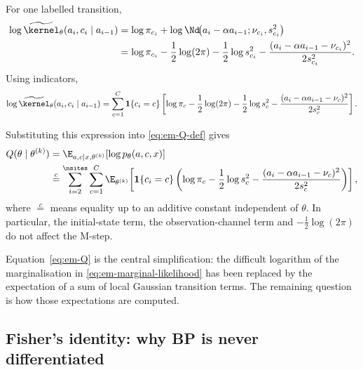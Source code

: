 For one labelled transition,
\begin{align}
  \log
  \widetilde\kernel_\theta(a_i,c_i\mid a_{i-1})
  &=
  \log\pi_{c_i}
  +
  \log
  \Nd\!\big(
    a_i-\alpha a_{i-1};
    \nu_{c_i},s_{c_i}^2
  \big)
  \nonumber\\
  &=
  \log\pi_{c_i}
  -\frac12\log(2\pi)
  -\frac12\log s_{c_i}^2
  -
  \frac{
    (a_i-\alpha a_{i-1}-\nu_{c_i})^2
  }{2s_{c_i}^2}.
  \label{eq:em-single-transition-log}
\end{align}
Using indicators,
\begin{align}
  \log
  \widetilde\kernel_\theta(a_i,c_i\mid a_{i-1})
  =
  \sum_{c=1}^{C}
  \mathbf 1\{c_i=c\}
  \left[
    \log\pi_c
    -\frac12\log(2\pi)
    -\frac12\log s_c^2
    -
    \frac{
      (a_i-\alpha a_{i-1}-\nu_c)^2
    }{2s_c^2}
  \right].
  \label{eq:em-indicator-transition}
\end{align}

Substituting this expression into \eqref{eq:em-Q-def} gives
\begin{align}
  Q(\theta\mid\theta^{(k)})
  &=
  \E_{a,c\mid x,\theta^{(k)}}
  \!\left[
    \log p_\theta(a,c,x)
  \right]
  \nonumber\\
  &\overset{c}{=}
  \sum_{i=2}^{\nsites}
  \sum_{c=1}^{C}
  \E_{\theta^{(k)}}\!
  \left[
    \mathbf 1\{c_i=c\}
    \left(
      \log\pi_c
      -\frac12\log s_c^2
      -
      \frac{
        (a_i-\alpha a_{i-1}-\nu_c)^2
      }{2s_c^2}
    \right)
  \right],
  \label{eq:em-Q}
\end{align}
where $\overset{c}{=}$ means equality up to an additive constant independent
of $\theta$. In particular, the initial-state term, the observation-channel
term and $-\frac12\log(2\pi)$ do not affect the M-step.

Equation~\eqref{eq:em-Q} is the central simplification: the difficult
logarithm of the marginalisation in
\eqref{eq:em-marginal-likelihood} has been replaced by the expectation of a
sum of local Gaussian transition terms. The remaining question is how those
expectations are computed.

\subsection{Fisher's identity: why BP is never differentiated}


